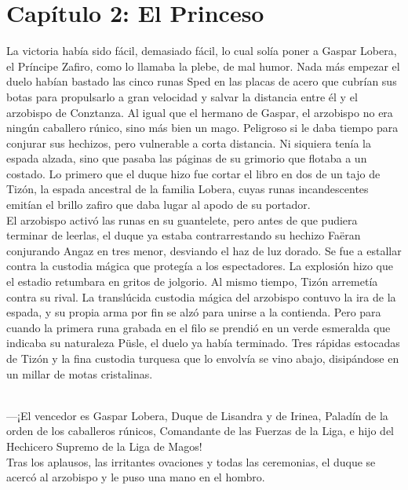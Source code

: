 \documentclass[
  letterpaper,
]{krantz}
\begin{document}

\hypertarget{capuxedtulo-2-el-princeso}{%
\chapter{Capítulo 2: El Princeso}\label{capuxedtulo-2-el-princeso}}

La victoria había sido fácil, demasiado fácil, lo cual solía poner a
Gaspar Lobera, el Príncipe Zafiro, como lo llamaba la plebe, de mal
humor. Nada más empezar el duelo habían bastado las cinco runas Sped en
las placas de acero que cubrían sus botas para propulsarlo a gran
velocidad y salvar la distancia entre él y el arzobispo de Conztanza. Al
igual que el hermano de Gaspar, el arzobispo no era ningún caballero
rúnico, sino más bien un mago. Peligroso si le daba tiempo para conjurar
sus hechizos, pero vulnerable a corta distancia. Ni siquiera tenía la
espada alzada, sino que pasaba las páginas de su grimorio que flotaba a
un costado. Lo primero que el duque hizo fue cortar el libro en dos de
un tajo de Tizón, la espada ancestral de la familia Lobera, cuyas runas
incandescentes emitían el brillo zafiro que daba lugar al apodo de su
portador.\\
El arzobispo activó las runas en su guantelete, pero antes de que
pudiera terminar de leerlas, el duque ya estaba contrarrestando su
hechizo Faëran conjurando Angaz en tres menor, desviando el haz de luz
dorado. Se fue a estallar contra la custodia mágica que protegía a los
espectadores. La explosión hizo que el estadio retumbara en gritos de
jolgorio. Al mismo tiempo, Tizón arremetía contra su rival. La
translúcida custodia mágica del arzobispo contuvo la ira de la espada, y
su propia arma por fin se alzó para unirse a la contienda. Pero para
cuando la primera runa grabada en el filo se prendió en un verde
esmeralda que indicaba su naturaleza Püsle, el duelo ya había terminado.
Tres rápidas estocadas de Tizón y la fina custodia turquesa que lo
envolvía se vino abajo, disipándose en un millar de motas cristalinas.\\
\strut \\
---¡El vencedor es Gaspar Lobera, Duque de Lisandra y de Irinea, Paladín
de la orden de los caballeros rúnicos, Comandante de las Fuerzas de la
Liga, e hijo del Hechicero Supremo de la Liga de Magos!\\
Tras los aplausos, las irritantes ovaciones y todas las ceremonias, el
duque se acercó al arzobispo y le puso una mano en el hombro.\\
\end{document}
